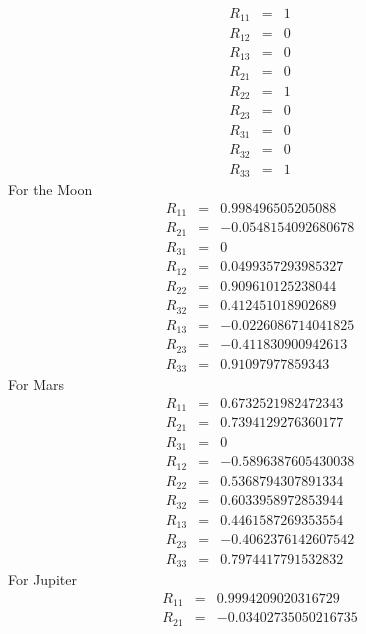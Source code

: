 {%
\begin{eqnarray}
    R_{11} & = & 1 \nonumber \\
    R_{12} & = & 0 \nonumber \\
    R_{13} & = & 0 \nonumber \\
    R_{21} & = & 0 \nonumber \\
    R_{22} & = & 1 \nonumber \\
    R_{23} & = & 0 \nonumber \\
    R_{31} & = & 0 \nonumber \\
    R_{32} & = & 0 \nonumber \\
    R_{33} & = & 1
\end{eqnarray}
%
For the Moon
%
\begin{eqnarray}
    R_{11} & = & 0.998496505205088 \nonumber \\
    R_{21} & = & -0.0548154092680678 \nonumber \\
    R_{31} & = & 0 \nonumber \\
    R_{12} & = & 0.0499357293985327 \nonumber \\
    R_{22} & = & 0.909610125238044 \nonumber \\
    R_{32} & = & 0.412451018902689 \nonumber \\
    R_{13} & = & -0.0226086714041825 \nonumber \\
    R_{23} & = & -0.411830900942613 \nonumber \\
    R_{33} & = & 0.91097977859343
\end{eqnarray}
%
For Mars
%
\begin{eqnarray}
   R_{11} & = &  0.6732521982472343 \nonumber \\
   R_{21} & = &  0.7394129276360177 \nonumber \\
   R_{31} & = &  0 \nonumber \\
   R_{12} & = &  -0.5896387605430038 \nonumber \\
   R_{22} & = &  0.5368794307891334 \nonumber \\
   R_{32} & = &  0.6033958972853944 \nonumber \\
   R_{13} & = &  0.4461587269353554 \nonumber \\
   R_{23} & = &  -0.4062376142607542 \nonumber \\
   R_{33} & = &  0.7974417791532832
\end{eqnarray}
%
For Jupiter
%
\begin{eqnarray}
   R_{11} & = &  0.9994209020316729 \nonumber \\
   R_{21} & = &  -0.03402735050216735 \nonumber \\

\end{eqnarray}}
